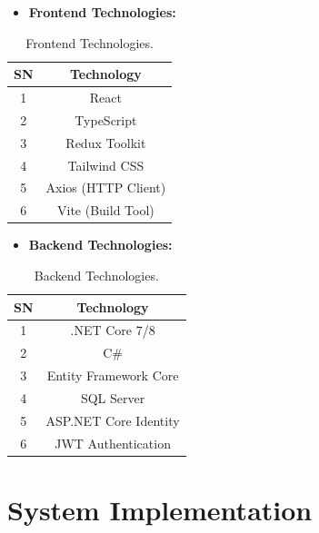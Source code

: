 \documentclass{thesis-library}
\begin{document}
\begin{itemize}
    \item \textbf{Frontend Technologies:}
\end{itemize}
\vspace{5pt}
\begin{table}[H]
    \centering
    \caption{Frontend Technologies.}
    \vspace{10pt}
    \begin{tabular}{|c|c|}
        \hline
        \textbf{SN} & \textbf{Technology} \\
        \hline
        1  & React \\
        2  & TypeScript \\
        3  & Redux Toolkit \\
        4  & Tailwind CSS \\
        5  & Axios (HTTP Client) \\
        6  & Vite (Build Tool) \\
        \hline
    \end{tabular}
\end{table}
\vspace{10pt}

\begin{itemize}
    \item \textbf{Backend Technologies:}
\end{itemize}
\vspace{5pt}
\begin{table}[H]
    \centering
    \caption{Backend Technologies.}
    \vspace{10pt}
    \begin{tabular}{|c|c|}
        \hline
        \textbf{SN} & \textbf{Technology} \\
        \hline
        1  & .NET Core 7/8 \\
        2  & C\# \\
        3  & Entity Framework Core \\
        4  & SQL Server \\
        5  & ASP.NET Core Identity \\
        6  & JWT Authentication \\
        \hline
    \end{tabular}
\end{table}
\vspace{10pt}

\section{System Implementation}
\end{document}
